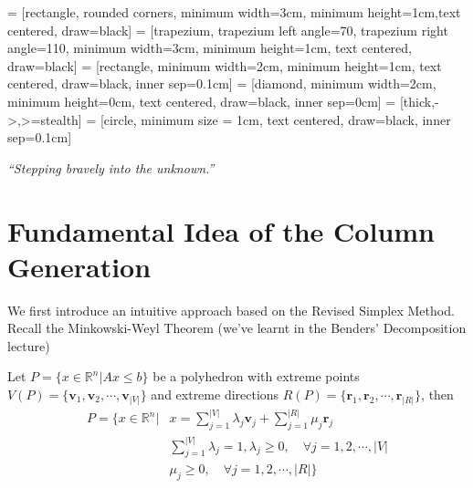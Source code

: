 
\usepackage{makecell}

\usetikzlibrary{shapes.geometric, arrows}
     = [rectangle, rounded corners, minimum width=3cm, minimum height=1cm,text centered, draw=black]
     = [trapezium, trapezium left angle=70, trapezium right angle=110, minimum width=3cm, minimum height=1cm, text centered, draw=black]
     = [rectangle, minimum width=2cm, minimum height=1cm, text centered, draw=black, inner sep=0.1cm]
     = [diamond, minimum width=2cm, minimum height=0cm, text centered, draw=black, inner sep=0cm]
     = [thick,->,>=stealth]
     = [circle, minimum size = 1cm, text centered, draw=black, inner sep=0.1cm]

\renewcommand{\docTitle}{Lecture 7 - Vehicle Routing Problem with Time Windows\\and Column Generation}
\renewcommand{\docAuthor}{Lan Peng, Ph.D.}
\renewcommand{\docAffil}{School of Management, Shanghai University, Shanghai, China}

    \titleSec

    \begin{center}
        \textit{``Stepping bravely into the unknown.''}
    \end{center}

    \section{Fundamental Idea of the Column Generation}
        We first introduce an intuitive approach based on the Revised Simplex Method. Recall the Minkowski-Weyl Theorem (we've learnt in the Benders' Decomposition lecture)

        \begin{theorem}
            Let $P = \{x \in \mathbb{R}^n | Ax \le b\}$ be a polyhedron with extreme points $V(P) = \{\mathbf{v}_1, \mathbf{v}_2, \cdots, \mathbf{v}_{|V|}\}$ and extreme directions $R(P) = \{\mathbf{r}_1, \mathbf{r}_2, \cdots, \mathbf{r}_{|R|}\}$, then
            \begin{align*}
                P = \{x \in \mathbb{R}^n |& x = \sum_{j = 1}^{|V|} \lambda_j \mathbf{v}_j + \sum_{j = 1}^{|R|} \mu_j \mathbf{r}_j \\
                & \sum_{j = 1}^{|V|} \lambda_j = 1, \lambda_j \ge 0, \quad \forall j = 1, 2, \cdots, |V| \\
                & \mu_j \ge 0, \quad \forall j = 1, 2, \cdots, |R|\}
            \end{align*}
        \end{theorem}

